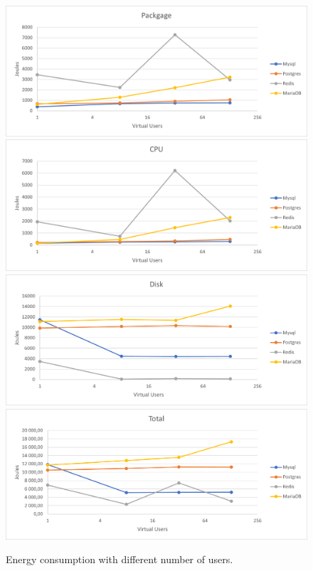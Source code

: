 \begin{figure}[h!]
\centering
\caption{Energy consumption with different number of users.}
\includegraphics[width=0.76\columnwidth]{results/vu/Packgage.png}
\includegraphics[width=0.76\columnwidth]{results/vu/CPU.png}
\includegraphics[width=0.76\columnwidth]{results/vu/Disk.png}
\includegraphics[width=0.76\columnwidth]{results/vu/Total.png}
\label{fig:vuyenergy}	
\end{figure}

